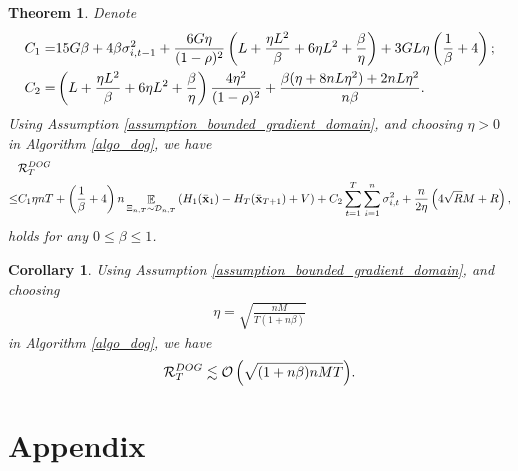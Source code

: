 \documentclass{article}
\newtheorem{Theorem}{\bf{Theorem}}
\newtheorem{Corollary}{\bf{Corollary}}
\begin{document}
\begin{Theorem}
\label{theorem_regret_upper_bound}
Denote 
\begin{align}
\nonumber
C_1 = & 15G\beta + 4\beta\sigma_{i,t-1}^2 + \frac{6G\eta}{(1-\rho)^2}\left(  L + \frac{\eta L^2}{\beta} + 6\eta L^2 + \frac{\beta}{\eta}  \right) + 3GL\eta\left( \frac{1}{\beta} + 4 \right); \\ \nonumber
C_2 = & \left(  L + \frac{\eta L^2}{\beta}  + 6\eta L^2  + \frac{\beta}{\eta}  \right) \frac{4\eta^2}{(1-\rho)^2} + \frac{\beta(\eta + 8nL\eta^2) + 2nL\eta^2}{n\beta}.
\end{align} Using Assumption \ref{assumption_bounded_gradient_domain}, and choosing $\eta>0$ in Algorithm \ref{algo_dog}, we have 
\begin{align}
\nonumber
& {\mathcal{R}}_T^{DOG} \\ \nonumber 
\le & C_1 \eta nT + \left( \frac{1}{\beta}+4 \right)n \mathop{\mathbb{E}}_{ \Xi_{n,T} \sim \mathcal{D}_{n,T} }\left( H_1(\bar{{\bf x}}_1) - H_T(\bar{{\bf x}}_{T+1}) + V \right) + C_2 \sum_{t=1}^T\sum_{i=1}^n \sigma_{i,t}^2 + \frac{n}{2\eta}\left(  4\sqrt{R}M + R   \right),
\end{align} holds for any $0\le \beta \le 1$.


\end{Theorem}


\begin{Corollary}
Using Assumption \ref{assumption_bounded_gradient_domain}, and choosing 
\begin{align}
\nonumber
\eta = \sqrt{\frac{nM}{T(1+n\beta)}}
\end{align} in Algorithm \ref{algo_dog}, we have
\begin{align}
\nonumber
{\mathcal{R}}_T^{DOG} \lesssim {\mathcal{O}\left( \sqrt{ (1+n\beta)nMT }  \right)}.
\end{align}






\end{Corollary}








\section*{Appendix}
\end{document}
